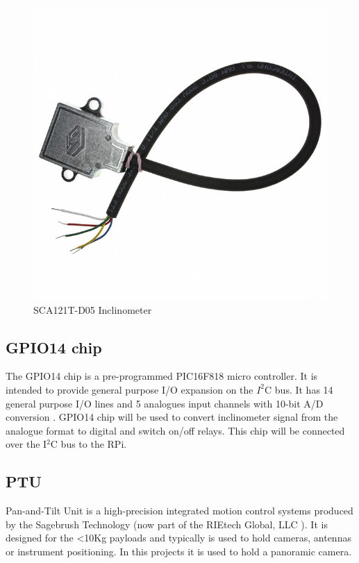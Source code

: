 \begin{figure}[H]
\centering
\centerline{\includegraphics[scale=0.20]{./images/SCA121T}}
\caption{SCA121T-D05 Inclinometer}
\label{fig:SCA121T-D05_inclinometer}
\end{figure}

\subsection{GPIO14 chip}
The GPIO14 chip is a pre-programmed PIC16F818 micro controller. It is intended to provide general purpose I/O expansion on the $I^2$C bus. It has 14 general purpose I/O lines and 5 analogues input channels with 10-bit A/D conversion \cite{GPIO14}. GPIO14 chip will be used to convert inclinometer signal from the analogue format to digital and switch on/off relays. This chip will be connected over the I$^2$C bus to the RPi.

\subsection{PTU}
Pan-and-Tilt Unit is a high-precision integrated motion control systems produced by the Sagebrush Technology (now part of the RIEtech Global, LLC \cite{RIEtech_Global}). It is designed for the <10Kg payloads and typically is used to hold cameras, antennas or instrument positioning. In this projects it is used to hold a panoramic camera. 

